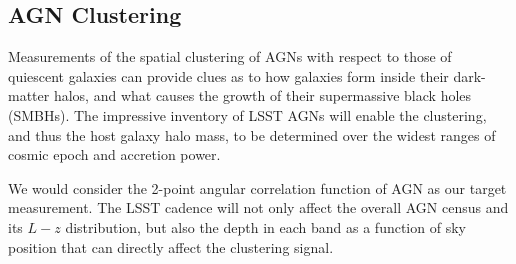 %
%

\subsection{AGN Clustering}
\def\secname{\chpname:clustering}\label{sec:\secname}


Measurements of the spatial clustering of AGNs with respect
to those of quiescent galaxies can provide clues as to how galaxies
form inside their dark-matter halos, and what causes the growth of
their supermassive black holes (SMBHs). The impressive inventory of
LSST AGNs will enable the clustering, and thus the host galaxy halo
mass, to be determined over the widest ranges of cosmic epoch
and accretion power.


%



We would consider the 2-point angular correlation function of AGN as our
target measurement.
The LSST cadence will not only affect the overall AGN census and its
$L-z$ distribution, but also the depth in each band as a function of
sky position that can directly affect the clustering signal.


